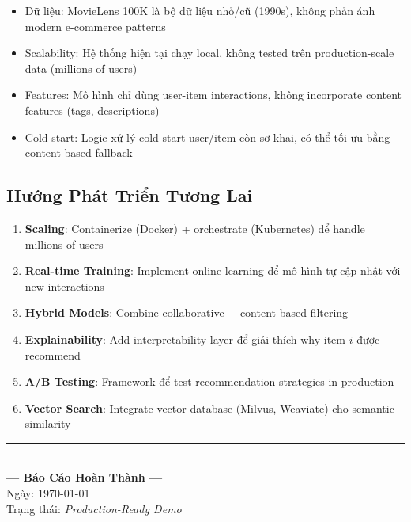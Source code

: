 \documentclass[12pt,a4paper]{article}
\begin{document}
\begin{itemize}
    \item Dữ liệu: MovieLens 100K là bộ dữ liệu nhỏ/cũ (1990s), không phản ánh modern e-commerce patterns
    \item Scalability: Hệ thống hiện tại chạy local, không tested trên production-scale data (millions of users)
    \item Features: Mô hình chỉ dùng user-item interactions, không incorporate content features (tags, descriptions)
    \item Cold-start: Logic xử lý cold-start user/item còn sơ khai, có thể tối ưu bằng content-based fallback
\end{itemize}

\subsection{Hướng Phát Triển Tương Lai}

\begin{enumerate}
    \item \textbf{Scaling}: Containerize (Docker) + orchestrate (Kubernetes) để handle millions of users
    \item \textbf{Real-time Training}: Implement online learning để mô hình tự cập nhật với new interactions
    \item \textbf{Hybrid Models}: Combine collaborative + content-based filtering
    \item \textbf{Explainability}: Add interpretability layer để giải thích why item $i$ được recommend
    \item \textbf{A/B Testing}: Framework để test recommendation strategies in production
    \item \textbf{Vector Search}: Integrate vector database (Milvus, Weaviate) cho semantic similarity
\end{enumerate}

\vspace{3cm}
\begin{center}
\noindent\rule{0.6\textwidth}{0.4pt}\\[0.3cm]
\textbf{---  Báo Cáo Hoàn Thành ---}\\[0.2cm]
Ngày: \today \\
Trạng thái: \textit{Production-Ready Demo}
\end{center}
\end{document}
